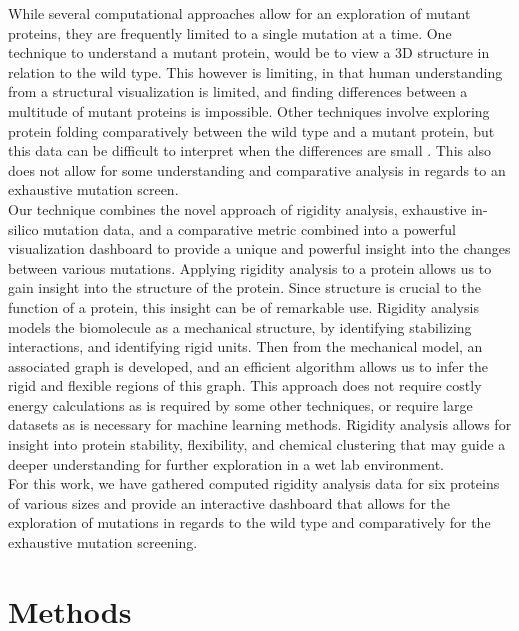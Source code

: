 \documentclass[11pt]{IEEEtran}
\begin{document}
While several computational approaches allow for an exploration of mutant proteins, they are frequently limited to a single mutation at a time.  One technique to understand a mutant protein, would be to view a 3D structure in relation to the wild type. This however is limiting, in that human understanding from a structural visualization is limited, and finding differences between a multitude of mutant proteins is impossible. Other techniques involve exploring protein folding comparatively between the wild type and a mutant protein, but this data can be difficult to interpret when the differences are small \cite{b4}. This also does not allow for some understanding and comparative analysis in regards to an exhaustive mutation screen.\\ 

Our technique combines the novel approach of rigidity analysis, exhaustive in-silico mutation data, and a comparative metric combined into a powerful visualization dashboard to provide a unique and powerful insight into the changes between various mutations. Applying rigidity analysis to a protein allows us to gain insight into the structure of the protein. Since structure is crucial to the function of a protein, this insight can be of remarkable use. Rigidity analysis models the biomolecule as a mechanical structure, by identifying stabilizing interactions, and identifying rigid units. Then from the mechanical model, an associated graph is developed, and an efficient algorithm allows us to infer the rigid and flexible regions of this graph. This approach does not require costly energy calculations as is required by some other techniques, or require large datasets as is necessary for machine learning methods. Rigidity analysis allows for insight into protein stability, flexibility, and chemical clustering that may guide a deeper understanding for further exploration in a wet lab environment.\\

For this work, we have gathered computed rigidity analysis data for six proteins of various sizes and provide an interactive dashboard that allows for the exploration of mutations in regards to the wild type and comparatively for the exhaustive mutation screening.



\section{Methods}
\end{document}
